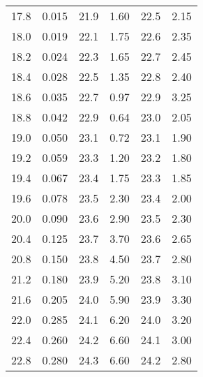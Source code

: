 \begin{longtable}{S[table-format=3.2] S[table-format=3.2] S[table-format=3.2] S[table-format=3.2] S[table-format=3.2] S[table-format=3.2]}
          17.8   &   0.015  &     21.9    &  1.60   & 22.5   &   2.15                                      \\
          18.0   &   0.019  &     22.1    &  1.75   & 22.6   &   2.35                                      \\
          18.2   &   0.024  &     22.3    &  1.65   & 22.7   &   2.45                                      \\
          18.4   &   0.028  &     22.5    &  1.35   & 22.8   &   2.40                                      \\
          18.6   &   0.035  &     22.7    &  0.97   & 22.9   &   3.25                                      \\
          18.8   &   0.042  &     22.9    &  0.64   & 23.0   &   2.05                                      \\
          19.0   &   0.050  &     23.1    &  0.72   & 23.1   &   1.90                                      \\
          19.2   &   0.059  &     23.3    &  1.20   & 23.2   &   1.80                                      \\
          19.4   &   0.067  &     23.4    &  1.75   & 23.3   &   1.85                                      \\
          19.6   &   0.078  &     23.5    &  2.30   & 23.4   &   2.00                                      \\
          20.0   &   0.090  &     23.6    &  2.90   & 23.5   &   2.30                                      \\
          20.4   &   0.125  &     23.7    &  3.70   & 23.6   &   2.65                                      \\
          20.8   &   0.150  &     23.8    &  4.50   & 23.7   &   2.80                                      \\
          21.2   &   0.180  &     23.9    &  5.20   & 23.8   &   3.10                                      \\
          21.6   &   0.205  &     24.0    &  5.90   & 23.9   &   3.30                                      \\
          22.0   &   0.285  &     24.1    &  6.20   & 24.0   &   3.20                                      \\
          22.4   &   0.260  &     24.2    &  6.60   & 24.1   &   3.00                                      \\
          22.8   &   0.280  &     24.3    &  6.60   & 24.2   &   2.80                                      \\

\end{longtable}
